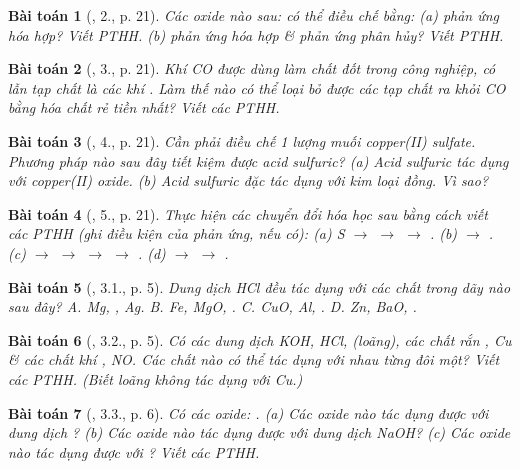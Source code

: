 \documentclass{article}
\newtheorem{baitoan}{Bài toán}
\begin{document}
\begin{baitoan}[\cite{SGK_Hoa_Hoc_9}, 2., p. 21]
	Các oxide nào sau: \emph{} có thể điều chế bằng: (a) phản ứng hóa hợp? Viết PTHH. (b) phản ứng hóa hợp \& phản ứng phân hủy? Viết PTHH.
\end{baitoan}

\begin{baitoan}[\cite{SGK_Hoa_Hoc_9}, 3., p. 21]
	Khí \emph{CO} được dùng làm chất đốt trong công nghiệp, có lẫn tạp chất là các khí \emph{}. Làm thế nào có thể loại bỏ được các tạp chất ra khỏi \emph{CO} bằng hóa chất rẻ tiền nhất? Viết các PTHH.
\end{baitoan}

\begin{baitoan}[\cite{SGK_Hoa_Hoc_9}, 4., p. 21]
	Cần phải điều chế 1 lượng muối copper(II) sulfate. Phương pháp nào sau đây tiết kiệm được acid sulfuric? (a) Acid sulfuric tác dụng với copper(II) oxide. (b) Acid sulfuric đặc tác dụng với kim loại đồng. Vì sao?
\end{baitoan}

\begin{baitoan}[\cite{SGK_Hoa_Hoc_9}, 5., p. 21]
	Thực hiện các chuyển đổi hóa học sau bằng cách viết các PTHH (ghi điều kiện của phản ứng, nếu có): (a) \emph{S $\to$  $\to$  $\to$ }. (b) \emph{ $\to$ }. (c) \emph{ $\to$  $\to$  $\to$  $\to$ }. (d) \emph{ $\to$  $\to$ }.
\end{baitoan}

\begin{baitoan}[\cite{SBT_Hoa_Hoc_9}, 3.1., p. 5]
	Dung dịch \emph{HCl} đều tác dụng với các chất trong dãy nào sau đây? {\sf A.} \emph{Mg, , Ag}. {\sf B.} \emph{Fe, MgO, }. {\sf C.} \emph{CuO, Al, }. {\sf D.} \emph{Zn, BaO, }.
\end{baitoan}

\begin{baitoan}[\cite{SBT_Hoa_Hoc_9}, 3.2., p. 5]
	Có các dung dịch \emph{KOH, HCl, } (loãng), các chất rắn \emph{, Cu} \& các chất khí \emph{, NO}. Các chất nào có thể tác dụng với nhau từng đôi một? Viết các PTHH. (Biết \emph{} loãng không tác dụng với \emph{Cu}.)
\end{baitoan}

\begin{baitoan}[\cite{SBT_Hoa_Hoc_9}, 3.3., p. 6]
	Có các oxide: \emph{}. (a) Các oxide nào tác dụng được với dung dịch \emph{}? (b) Các oxide nào tác dụng được với dung dịch \emph{NaOH}? (c) Các oxide nào tác dụng được với \emph{}? Viết các PTHH.
\end{baitoan}
\end{document}
